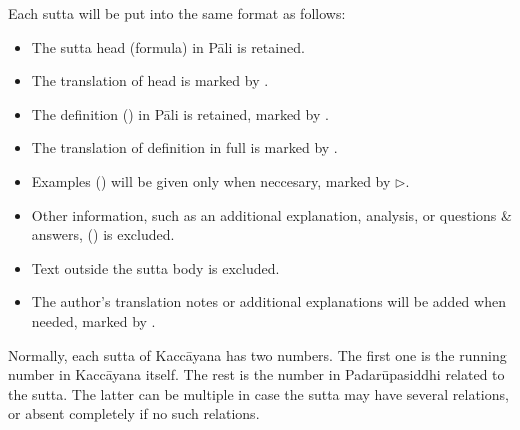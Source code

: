 Each sutta will be put into the same format as follows:

\begin{itemize}
\item The sutta head (formula) in Pāli is retained.
\item The translation of head is marked by \faHeart[regular].
\item The definition () in Pāli is retained, marked by \faAngleRight.
\item The translation of definition in full is marked by \faAngleDoubleRight.
\item Examples () will be given only when neccesary, marked by $\triangleright$.
\item Other information, such as an additional explanation, analysis, or questions \& answers, () is excluded.
\item Text outside the sutta body is excluded.
\item The author's translation notes or additional explanations will be added when needed, marked by \faLightbulb[regular].
\end{itemize}

Normally, each sutta of Kaccāyana has two numbers. The first one is the running number in Kaccāyana itself. The rest is the number in Padarūpasiddhi related to the sutta. The latter can be multiple in case the sutta may have several relations, or absent completely if no such relations.
